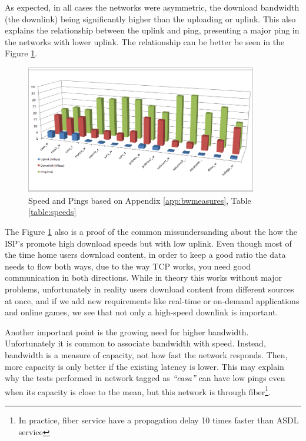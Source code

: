 As expected, in all cases the networks were asymmetric, 
the download bandwidth (the downlink) being significantly higher than the uploading
or uplink. This also explains the relationship between the uplink and ping,
presenting a major ping in the networks with lower uplink. The relationship
can be better be seen in the Figure \ref{fig:speeds}.

\begin{figure}[ht]
\centering
    \includegraphics[width=0.9\textwidth]{img/speed_graph}
\caption{Speed and Pings based on Appendix \ref{app:bwmeasures}, Table \ref{table:speeds}}
\label{fig:speeds}
\end{figure}%

The Figure \ref{fig:speeds} also is a proof of the common missundersanding
about the how the ISP's promote high download speeds but with low uplink. Even
though most of the time home users download content, in order to keep a good
ratio the data needs to flow both ways, due to the way TCP
works, you need good communication in both directions. While in theory this
works without major problems, unfortunately in reality users download content
from different sources at once, and if we add new requirements like real-time  or on-demand applications and online games, we see that not only a
high-speed downlink is important.

Another important point is the growing need for higher bandwidth.
Unfortunately it is common to associate bandwidth with speed. Instead,
bandwidth is a measure of capacity, not how fast the network responds. Then,
more capacity is only better if the existing latency is lower. This may
explain why the tests performed in network tagged as \textit{``casa''} can have low pings
even when its capacity is close to the mean, but this network is through
fiber\footnote{In practice, fiber service have a propagation delay 10 times
faster than ASDL service}.

